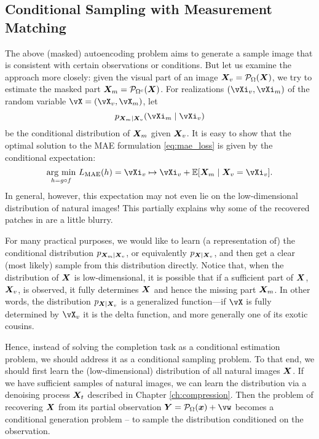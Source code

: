 \documentclass[../../book-main.tex]{subfiles}
\begin{document}
\subsection{Conditional Sampling with Measurement Matching}
\label{sec:conditioned-decoding}
The above (masked) autoencoding problem aims to generate a sample image that is consistent with certain observations or conditions. But let us examine the approach more closely: given the
visual part of an image $\bm{X}_v = \mathcal{P}_{\Omega}(\bm{X})$, we try to
estimate the masked part $\bm{X}_m = \mathcal{P}_{\Omega^c}(\bm{X})$. For realizations
$(\vXi_v, \vXi_m)$ of the random variable $\vX=(\vX_v, \vX_m)$, let
\[p_{\X_m \mid \X_v}(\vXi_m\mid \vXi_v)\]
be the conditional distribution of $\bm{X}_m$ given
$\bm{X}_v$. It is easy to show that the optimal solution to the  MAE
formulation \eqref{eq:mae_loss} is given by the conditional expectation:
\begin{equation}
  \argmin_{h = g \circ f}\, L_{\mathrm{MAE}}(h)
  = \vXi_v \mapsto \vXi_v + \mathbb{E}[\X_m \mid \X_v=\vXi_v].
\end{equation}
In general, however, this expectation may not even lie on the
low-dimensional distribution of natural images! This partially
explains why some of the recovered patches in 
are a little blurry.

For many practical purposes, we would like to learn (a representation
of) the conditional distribution $p_{\bm{X}_m \mid \bm{X}_v}$, or equivalently
$p_{\bm{X} \mid \bm{X}_v}$,
and then get a clear (most likely) sample from this distribution directly. Notice that, when the distribution of $\bm{X}$ is low-dimensional, it is possible that if a
sufficient part of $\bm{X}$, $\bm{X}_v$, is observed, it fully determines
$\bm{X}$ and hence the missing part $\bm{X}_m$. In other words, the distribution
$p_{\bm{X} \mid \bm{X}_v}$ is a generalized function---if $\vX$ is fully determined by $\vX_v$ it is the delta function, and more generally one of its exotic cousins.

Hence, instead of solving the completion task as a conditional estimation problem, we should address it as a conditional sampling problem. To that end, we should first learn the (low-dimensional) distribution of all natural images $\bm{X}$. If we have sufficient samples of natural images, we can learn the distribution via a denoising process $\bm{X}_t$ described in Chapter \ref{ch:compression}. Then the problem of recovering $\bm{X}$ from its partial observation $\Y = \mathcal{P}_\Omega(\x) +\vw$ becomes a conditional generation problem -- to sample the distribution conditioned on the observation.
\end{document}
